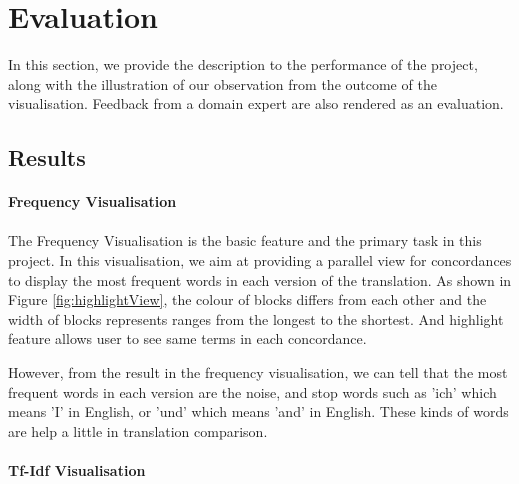 \clearpage
\section{Evaluation}
In this section, we provide the description to the performance of the project, along with the illustration of our observation from the outcome of the visualisation. Feedback from a domain expert are also rendered as an evaluation.

\subsection{Results}

\paragraph{Frequency Visualisation}
\paragraph[]{}
The Frequency Visualisation is the basic feature and the primary task in this project. In this visualisation, we aim at providing a parallel view for concordances to display the most frequent words in each version of the translation. As shown in Figure \ref{fig:highlightView}, the colour of blocks differs from each other and the width of blocks represents ranges from the longest to the shortest. And highlight feature allows user to see same terms in each concordance. 

However, from the result in the frequency visualisation, we can tell that the most frequent words in each version are the noise, and stop words such as 'ich' which means 'I' in English, or 'und' which means 'and' in English. These kinds of words are help a little in translation comparison.

\paragraph{Tf-Idf Visualisation}
